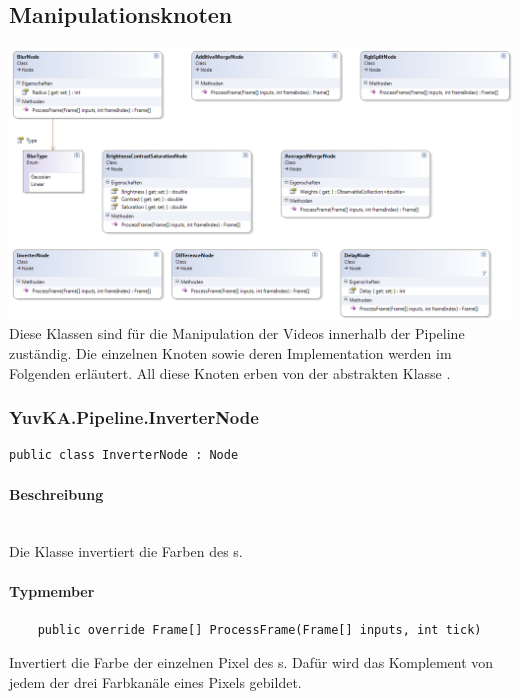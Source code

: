 \subsection{Manipulationsknoten}

\includegraphics[width=\textwidth]{YuvKA.Pipeline/manipulationnodes.png}
Diese Klassen sind für die Manipulation der Videos innerhalb der Pipeline zuständig. Die einzelnen Knoten sowie deren Implementation werden im Folgenden erläutert. All diese Knoten erben von der abstrakten Klasse .

\subsubsection{YuvKA.Pipeline.InverterNode}
\begin{verbatim}
public class InverterNode : Node
\end{verbatim}

\paragraph{Beschreibung}~\\
Die Klasse  invertiert die Farben des s.

\paragraph{Typmember}
\begin{itemize}

	\begin{verbatim}
	public override Frame[] ProcessFrame(Frame[] inputs, int tick)
	\end{verbatim}
	Invertiert die Farbe der einzelnen Pixel des s. Dafür wird das Komplement von jedem der drei Farbkanäle eines Pixels gebildet.

\end{itemize}


